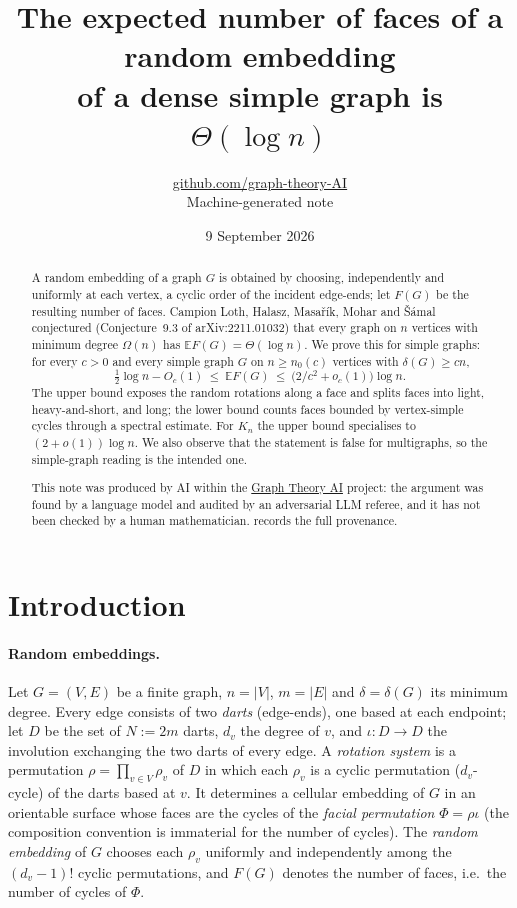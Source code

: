 \documentclass[11pt,a4paper]{article}
\title{The expected number of faces of a random embedding\\ of a dense simple graph is $\Theta(\log n)$}
\author{\href{https://github.com/graph-theory-AI}{github.com/graph-theory-AI}\\[2pt] \normalsize Machine-generated note}
\date{9 September 2026}
\theoremstyle{plain}
\theoremstyle{definition}
\theoremstyle{remark}
\newcommand{\E}{\mathbb E}
\begin{document}
\maketitle


\begin{abstract}
A random embedding of a graph $G$ is obtained by choosing, independently and uniformly at each vertex, a cyclic order of the incident edge-ends; let $F(G)$ be the resulting number of faces. Campion Loth, Halasz, Masařík, Mohar and Šámal conjectured (Conjecture~9.3 of arXiv:2211.01032) that every graph on $n$ vertices with minimum degree $\Omega(n)$ has $\E F(G)=\Theta(\log n)$. We prove this for simple graphs: for every $c>0$ and every simple graph $G$ on $n\ge n_0(c)$ vertices with $\delta(G)\ge cn$,
\[
 \tfrac12\log n-O_c(1)\ \le\ \E F(G)\ \le\ \bigl(2/c^2+o_c(1)\bigr)\log n .
\]
The upper bound exposes the random rotations along a face and splits faces into light, heavy-and-short, and long; the lower bound counts faces bounded by vertex-simple cycles through a spectral estimate. For $K_n$ the upper bound specialises to $(2+o(1))\log n$. We also observe that the statement is false for multigraphs, so the simple-graph reading is the intended one.

\medskip\noindent\small
This note was produced by AI within the \href{https://github.com/graph-theory-AI/Graph-Theory-LLM-Proofs}{Graph Theory AI} project:
the argument was found by a language model and audited by an adversarial LLM
referee, and it has not been checked by a human mathematician.
 records the full provenance.

\end{abstract}

\section{Introduction}\label{sec:intro}

\paragraph{Random embeddings.}
Let $G=(V,E)$ be a finite graph, $n=|V|$, $m=|E|$ and $\delta=\delta(G)$ its minimum degree. Every edge consists of two \emph{darts} (edge-ends), one based at each endpoint; let $D$ be the set of $N:=2m$ darts, $d_v$ the degree of $v$, and $\iota\colon D\to D$ the involution exchanging the two darts of every edge. A \emph{rotation system} is a permutation $\rho=\prod_{v\in V}\rho_v$ of $D$ in which each $\rho_v$ is a cyclic permutation ($d_v$-cycle) of the darts based at $v$. It determines a cellular embedding of $G$ in an orientable surface whose faces are the cycles of the \emph{facial permutation} $\Phi=\rho\iota$ (the composition convention is immaterial for the number of cycles). The \emph{random embedding} of $G$ chooses each $\rho_v$ uniformly and independently among the $(d_v-1)!$ cyclic permutations, and $F(G)$ denotes the number of faces, i.e.\ the number of cycles of $\Phi$.
\end{document}
